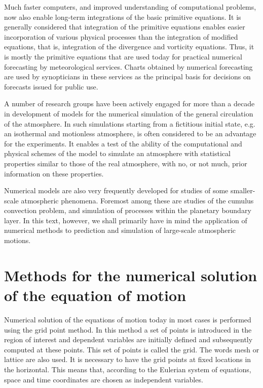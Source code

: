Much faster computers, and improved understanding of computational problems, now also enable long-term integrations of the basic primitive equations. It is gener­ally considered that integration of the primitive equations enables easier incorporation of various physical processes than the integration of modified equations, that is, inte­gration of the divergence and vorticity equations. Thus, it is mostly the primitive equations that are used today for practical numerical forecasting by meteorological services. Charts obtained by numerical forecasting are used by synopticians in these services as the principal basis for decisions on forecasts issued for public use.

A number of research groups have been actively engaged for more than a decade in development of models for the numerical simulation of the general circulation of the atmosphere. In such simulations starting from a fictitious initial state, e.g. an isothermal and motionless atmosphere, is often considered to be an advantage for the experiments. It enables a test of the ability of the computational and physical schemes of the model to simulate an atmosphere with statistical properties similar to those of the real atmosphere, with no, or not much, prior information on these properties.

Numerical models are also very frequently developed for studies of some smaller-scale atmospheric phenomena. Foremost among these are studies of the cumulus convec­tion problem, and simulation of processes within the planetary boundary layer. In this text, however, we shall primarily have in mind the application of numerical methods to prediction and simulation of large-scale atmospheric motions.

\section{Methods for the numerical solution of the equation of motion}
Numerical solution of the equations of motion today in most cases is performed using the grid point method. In this method a set of points is introduced in the region of interest and dependent variables are initially defined and subsequently computed at these points. This set of points is called the grid. The words mesh or lattice are also used. It is necessary to have the grid points at fixed locations in the horizontal. This means that, according to the Eulerian system of equations, space and time coordinates are chosen as independent variables.

